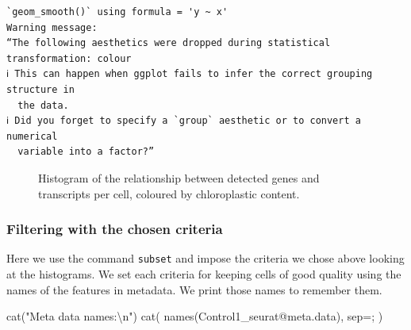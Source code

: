 \documentclass[
  letterpaper,
  DIV=11,
  numbers=noendperiod]{scrartcl}
\newenvironment{Shaded}{}{}
\newcommand{\AttributeTok}[1]{\textcolor[rgb]{0.49,0.56,0.16}{#1}}
\newcommand{\FunctionTok}[1]{\textcolor[rgb]{0.02,0.16,0.49}{#1}}
\newcommand{\NormalTok}[1]{#1}
\newcommand{\SpecialCharTok}[1]{\textcolor[rgb]{0.25,0.44,0.63}{#1}}
\newcommand{\StringTok}[1]{\textcolor[rgb]{0.25,0.44,0.63}{#1}}
\begin{document}
\begin{verbatim}
`geom_smooth()` using formula = 'y ~ x'
Warning message:
“The following aesthetics were dropped during statistical transformation: colour
ℹ This can happen when ggplot fails to infer the correct grouping structure in
  the data.
ℹ Did you forget to specify a `group` aesthetic or to convert a numerical
  variable into a factor?”
\end{verbatim}

\begin{figure}[H]


\caption{\label{fig-gentrach}Histogram of the relationship between
detected genes and transcripts per cell, coloured by chloroplastic
content.}

\end{figure}%

\subsubsection{Filtering with the chosen
criteria}\label{filtering-with-the-chosen-criteria}

Here we use the command \texttt{subset} and impose the criteria we chose
above looking at the histograms. We set each criteria for keeping cells
of good quality using the names of the features in metadata. We print
those names to remember them.

\begin{Shaded}
\begin{Highlighting}[]
\FunctionTok{cat}\NormalTok{(}\StringTok{"Meta data names:}\SpecialCharTok{\textbackslash{}n}\StringTok{"}\NormalTok{)}
\FunctionTok{cat}\NormalTok{( }\FunctionTok{names}\NormalTok{(Control1\_seurat}\SpecialCharTok{@}\NormalTok{meta.data), }\AttributeTok{sep=}\StringTok{\textquotesingle{}; \textquotesingle{}}\NormalTok{ )}
\end{Highlighting}
\end{Shaded}
\end{document}
